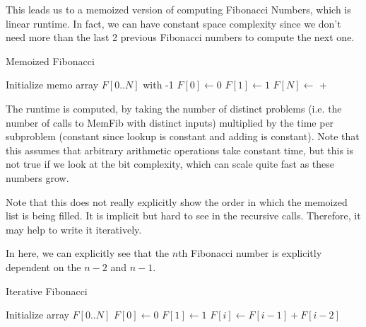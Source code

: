   \begin{algo}
    This leads us to a memoized version of computing Fibonacci Numbers, which is linear runtime. In fact, we can have constant space complexity since we don't need more than the last 2 previous Fibonacci numbers to compute the next one. 
    
    \begin{algorithm}[H]
      \caption{Memoized Fibonacci}
      \label{alg:memfib_rec}
      \begin{algorithmic}
        \State Initialize memo array $F[0..N]$ with -1
        \State $F[0] \gets 0$
        \State $F[1] \gets 1$
            \State {}
            \State {}
          \Else
            \State $F[N] \gets$  + 
            \State {}
          \EndIf
        \EndFunction
      \end{algorithmic}
    \end{algorithm}

    The runtime is computed, by taking the number of distinct problems (i.e. the number of calls to MemFib with distinct inputs) multiplied by the time per subproblem (constant since lookup is constant and adding is constant). Note that this assumes that arbitrary arithmetic operations take constant time, but this is not true if we look at the bit complexity, which can scale quite fast as these numbers grow. 
  \end{algo}

  Note that this does not really explicitly show the order in which the memoized list is being filled. It is implicit but hard to see in the recursive calls. Therefore, it may help to write it iteratively. 


  \begin{algo}
    In here, we can explicitly see that the $n$th Fibonacci number is explicitly dependent on the $n-2$ and $n-1$. 
    \begin{algorithm}[H]
      \caption{Iterative Fibonacci}
      \label{alg:iterfib}
      \begin{algorithmic}
        \State Initialize array $F[0..N]$
        \State $F[0] \gets 0$
        \State $F[1] \gets 1$
          \State $F[i] \gets F[i-1] + F[i-2]$
        \EndFor
        \State {}
      \end{algorithmic}
    \end{algorithm}
  \end{algo}

